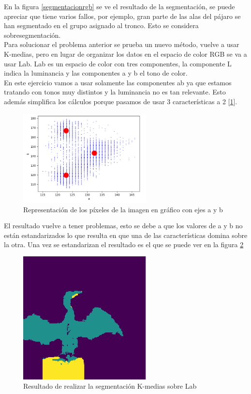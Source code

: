 \documentclass[a4paper,12pt]{report}
\begin{document}
En la figura \ref{segmentacionrgb} se ve el resultado de la segmentación, se puede apreciar que tiene varios fallos, por ejemplo, gran parte de las alas del pájaro se han segmentado en el grupo asignado al tronco. Esto se considera sobresegmentación.\\

Para solucionar el problema anterior se prueba un nuevo método, vuelve a usar K-medias, pero en lugar  de organizar los datos en el espacio de color RGB se va a usar Lab. Lab es un espacio de color con tres componentes, la componente L indica la luminancia y las componentes a y b el tono de color.\\

En este ejercicio vamos a usar solamente las componentes ab ya que estamos tratando con tonos muy distintos y la luminancia no es tan relevante. Esto además simplifica los cálculos porque pasamos de usar 3 características a 2 [\ref{cormoranlab}].\\

\begin{figure}[h]
\centering
\includegraphics[width=0.6\textwidth]{imagenes/cormoranlab}
\caption{Representación de los píxeles de la imagen en gráfico con ejes a y b}
\label{cormoranlab}
\end{figure}

El resultado vuelve a tener problemas, esto se debe a que los valores de a y b no están estandarizados lo que resulta en que una de las características domina sobre la otra. Una vez se estandarizan el resultado es el que se puede ver en la figura \ref{segmentacionlab}\\


\begin{figure}[h]
\centering
\includegraphics[width=0.6\textwidth]{imagenes/segmentacionlab}
\caption{Resultado de realizar la segmentación K-medias sobre Lab}
\label{segmentacionlab}
\end{figure}
\end{document}
